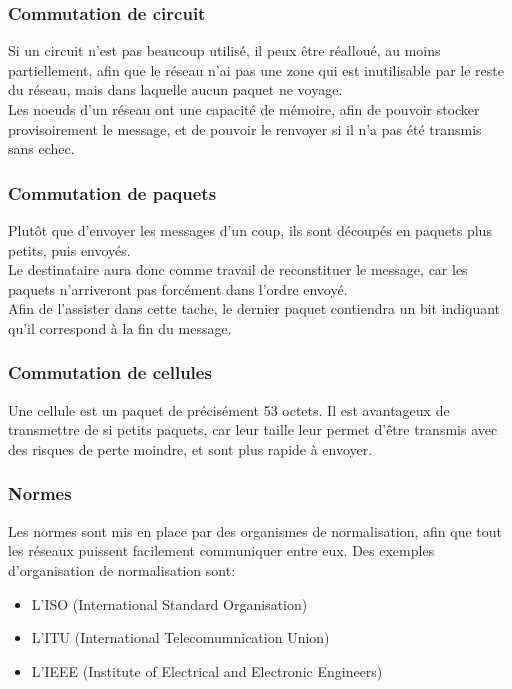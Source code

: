 \subsubsection{Commutation de circuit}
Si un circuit n'est pas beaucoup utilisé, il peux être réalloué, au moins partiellement, afin que le réseau n'ai pas
une zone qui est inutilisable par le reste du réseau, mais dans laquelle aucun paquet ne voyage.\\
Les noeuds d'un réseau ont une capacité de mémoire, afin de pouvoir stocker provisoirement le message, et de pouvoir
le renvoyer si il n'a pas été transmis sans echec.

\subsubsection{Commutation de paquets}
Plutôt que d'envoyer les messages d'un coup, ils sont découpés en paquets plus petits, puis envoyés.\\
Le destinataire aura donc comme travail de reconstituer le message, car les paquets n'arriveront pas forcément dans 
l'ordre envoyé.\\
Afin de l'assister dans cette tache, le dernier paquet contiendra un bit indiquant qu'il correspond à la fin du
message.\\

\subsubsection{Commutation de cellules}
Une cellule est un paquet de précisément 53 octets. Il est avantageux de transmettre de si petits paquets,
car leur taille leur permet d'être transmis avec des risques de perte moindre, et sont plus rapide à envoyer.

\subsubsection{Normes}
Les normes sont mis en place par des organismes de normalisation, afin que tout les réseaux puissent facilement
communiquer entre eux. Des exemples d'organisation de normalisation sont:
\begin{itemize}
	\item L'ISO  (International Standard Organisation)
	\item L'ITU  (International Telecomumnication Union)
	\item L'IEEE (Institute of Electrical and Electronic Engineers)
\end{itemize}


